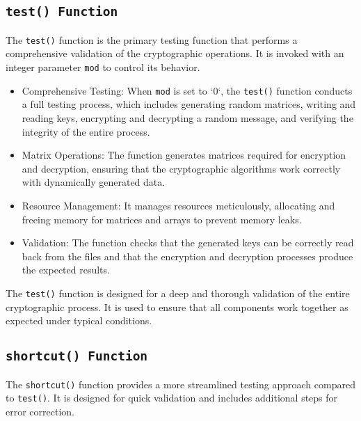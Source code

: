\subsection{\texttt{test() Function}}
The \texttt{test()} function is the primary testing function that performs a comprehensive validation of the cryptographic operations. It is invoked with an integer parameter \texttt{mod} to control its behavior.

\begin{itemize}
    \item Comprehensive Testing: When \texttt{mod} is set to `0`, the \texttt{test()} function conducts a full testing process, which includes generating random matrices, writing and reading keys, encrypting and decrypting a random message, and verifying the integrity of the entire process.
    \item Matrix Operations: The function generates matrices required for encryption and decryption, ensuring that the cryptographic algorithms work correctly with dynamically generated data.
    \item Resource Management: It manages resources meticulously, allocating and freeing memory for matrices and arrays to prevent memory leaks.
    \item Validation: The function checks that the generated keys can be correctly read back from the files and that the encryption and decryption processes produce the expected results.
\end{itemize}

The \texttt{test()} function is designed for a deep and thorough validation of the entire cryptographic process. It is used to ensure that all components work together as expected under typical conditions.

\subsection{\texttt{shortcut() Function}}
The \texttt{shortcut()} function provides a more streamlined testing approach compared to \texttt{test()}. It is designed for quick validation and includes additional steps for error correction.


